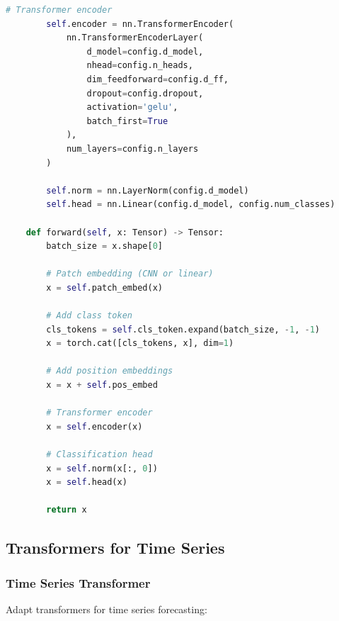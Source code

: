 \documentclass[11pt]{article}
\begin{document}
\begin{lstlisting}[language=Python, caption=Hybrid CNN-Transformer]
        # Transformer encoder
        self.encoder = nn.TransformerEncoder(
            nn.TransformerEncoderLayer(
                d_model=config.d_model,
                nhead=config.n_heads,
                dim_feedforward=config.d_ff,
                dropout=config.dropout,
                activation='gelu',
                batch_first=True
            ),
            num_layers=config.n_layers
        )
        
        self.norm = nn.LayerNorm(config.d_model)
        self.head = nn.Linear(config.d_model, config.num_classes)
        
    def forward(self, x: Tensor) -> Tensor:
        batch_size = x.shape[0]
        
        # Patch embedding (CNN or linear)
        x = self.patch_embed(x)
        
        # Add class token
        cls_tokens = self.cls_token.expand(batch_size, -1, -1)
        x = torch.cat([cls_tokens, x], dim=1)
        
        # Add position embeddings
        x = x + self.pos_embed
        
        # Transformer encoder
        x = self.encoder(x)
        
        # Classification head
        x = self.norm(x[:, 0])
        x = self.head(x)
        
        return x
\end{lstlisting}

\subsection{Transformers for Time Series}

\subsubsection{Time Series Transformer}

Adapt transformers for time series forecasting:
\end{document}
